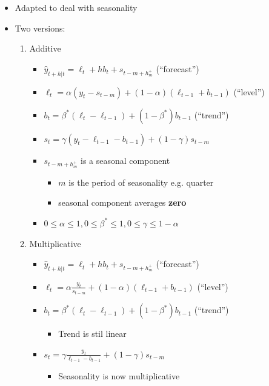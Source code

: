 \documentclass{article}\usepackage[]{graphicx}\usepackage[]{color}
\begin{document}
\begin{itemize}
    \item Adapted to deal with seasonality
    \item Two versions:
    \begin{enumerate}
        \item Additive
            \begin{itemize}
                \item $\hat{y}_{t+h|t} = \ell_t + hb_t + s_{t-m+h_m^+}$ (``forecast'')
                \item $\ell_t = \alpha (y_t - s_{t-m})+ (1 - \alpha)(\ell_{t-1} + b_{t-1})$ (``level'')
                \item $b_t = \beta^*(\ell_t - \ell_{t-1}) + (1 - \beta^*) b_{t-1}$ (``trend'')
                \item $s_t = \gamma (y_t - \ell_{t-1} - b_{t-1}) + (1-\gamma)s_{t-m}$
                \item $s_{t-m+h_m^+}$ is a seasonal component
                \begin{itemize}
                    \item $m$ is the period of seasonality e.g. quarter
                    \item seasonal component averages \textbf{zero}
                \end{itemize}
                \item $0 \le \alpha \le 1, 0 \le \beta^* \le 1, 0 \le \gamma \le 1-\alpha$
            \end{itemize}
        \item Multiplicative
        \begin{itemize}
            \item $\hat{y}_{t+h|t} = \ell_t + hb_t + s_{t-m+h_m^+}$ (``forecast'')
            \item $\ell_t = \alpha \frac{y_t}{ s_{t-m}} + (1 - \alpha)(\ell_{t-1} + b_{t-1})$ (``level'')
            \item $b_t = \beta^*(\ell_t - \ell_{t-1}) + (1 - \beta^*) b_{t-1}$ (``trend'')
            \begin{itemize}
                \item Trend is stil linear
            \end{itemize}
            \item $s_t = \gamma \frac{y_t}{\ell_{t-1} - b_{t-1}} + (1-\gamma)s_{t-m}$
            \begin{itemize}
                \item Seasonality is now multiplicative

\end{itemize}
\end{itemize}
\end{enumerate}
\end{itemize}
\end{document}
